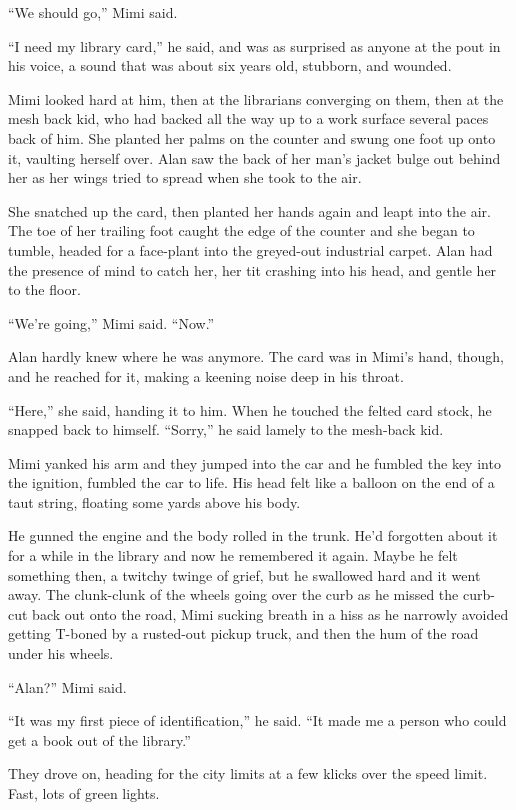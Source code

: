 \documentclass{article}
\begin{document}
``We should go,'' Mimi said.

``I need my library card,'' he said, and was as surprised as anyone at
the pout in his voice, a sound that was about six years old, stubborn,
and wounded.

Mimi looked hard at him, then at the librarians converging on them,
then at the mesh back kid, who had backed all the way up to a work
surface several paces back of him.  She planted her palms on the
counter and swung one foot up onto it, vaulting herself over.  Alan
saw the back of her man's jacket bulge out behind her as her wings
tried to spread when she took to the air.

She snatched up the card, then planted her hands again and leapt into
the air.  The toe of her trailing foot caught the edge of the counter
and she began to tumble, headed for a face-plant into the greyed-out
industrial carpet.  Alan had the presence of mind to catch her, her
tit crashing into his head, and gentle her to the floor.

``We're going,'' Mimi said.  ``Now.''

Alan hardly knew where he was anymore.  The card was in Mimi's hand,
though, and he reached for it, making a keening noise deep in his
throat.

``Here,'' she said, handing it to him.  When he touched the felted
card stock, he snapped back to himself.  ``Sorry,'' he said lamely to
the mesh-back kid.

Mimi yanked his arm and they jumped into the car and he fumbled the
key into the ignition, fumbled the car to life.  His head felt like a
balloon on the end of a taut string, floating some yards above his
body.

He gunned the engine and the body rolled in the trunk.  He'd forgotten
about it for a while in the library and now he remembered it again. 
Maybe he felt something then, a twitchy twinge of grief, but he
swallowed hard and it went away.  The clunk-clunk of the wheels going
over the curb as he missed the curb-cut back out onto the road, Mimi
sucking breath in a hiss as he narrowly avoided getting T-boned by a
rusted-out pickup truck, and then the hum of the road under his
wheels.

``Alan?'' Mimi said.

``It was my first piece of identification,'' he said.  ``It made me a
person who could get a book out of the library.''

They drove on, heading for the city limits at a few klicks over the
speed limit.  Fast, lots of green lights.
\end{document}
